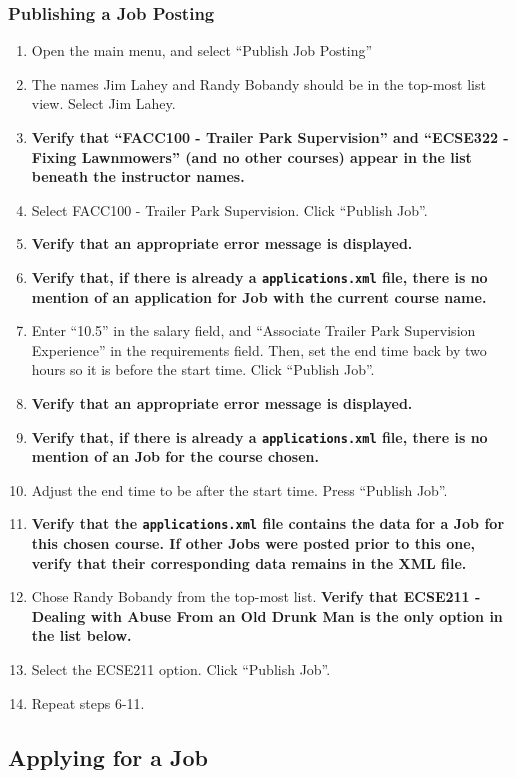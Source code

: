 \documentclass[12pt]{report}
\begin{document}
\subsubsection{Publishing a Job Posting}
\begin{enumerate}
	\item Open the main menu, and select ``Publish Job Posting''
	\item The names Jim Lahey and Randy Bobandy should be in the top-most list view. Select Jim
		Lahey.
	\item \textbf{Verify that ``FACC100 - Trailer Park Supervision'' and ``ECSE322 - Fixing
			Lawnmowers'' (and no other courses) appear in the list beneath the instructor names.}
	\item Select FACC100 - Trailer Park Supervision. Click ``Publish Job''.
	\item \textbf{Verify that an appropriate error message is displayed.}
	\item \textbf{Verify that, if there is already a \texttt{applications.xml} file, there is no
	mention of an application for Job with the current course name.}
	\item Enter ``10.5'' in the salary field, and ``Associate Trailer Park Supervision Experience''
		in the requirements field. Then, set the end time back by two hours so it is before the
		start time. Click ``Publish Job''.
	\item \textbf{Verify that an appropriate error message is displayed.}
	\item \textbf{Verify that, if there is already a \texttt{applications.xml} file, there is no
	mention of an Job for the course chosen.}
	\item Adjust the end time to be after the start time. Press ``Publish Job''.
	\item \textbf{Verify that the \texttt{applications.xml} file contains the data for a Job for
		this chosen course. If other Jobs were posted prior to this one, verify that their
	corresponding data remains in the XML file.}
	\item Chose Randy Bobandy from the top-most list. \textbf{Verify that ECSE211 - Dealing with
		Abuse From an Old Drunk Man is the only option in the list below.} 
	\item Select the ECSE211 option. Click ``Publish Job''.
	\item Repeat steps 6-11.
\end{enumerate}
\subsection{Applying for a Job}
\end{document}
